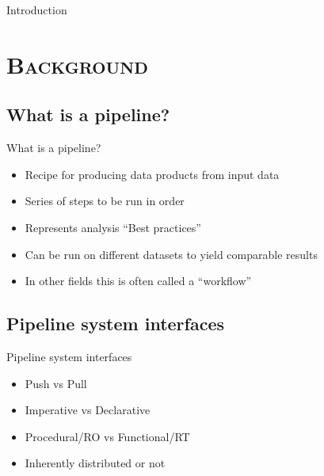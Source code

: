 \documentclass[xcolor=x11names,compress]{beamer}
\renewcommand{\(}{\begin{columns}}
\renewcommand{\)}{\end{columns}}
\newcommand{\<}[1]{\begin{column}{#1}}
\renewcommand{\>}{\end{column}}
\begin{document}
\begin{frame}{Introduction}
\pipesbackground
\begin{shadedbox}
\tableofcontents
\end{shadedbox}
\end{frame}


\section{\scshape Background}

\subsection{What is a pipeline?}
\begin{frame}{What is a pipeline?}
\pipesbackground
\begin{shadedbox}
\begin{itemize}
\item Recipe for producing data products from input data
\item Series of steps to be run in order
\item Represents analysis ``Best practices''
\item Can be run on different datasets to yield comparable results
\item In other fields this is often called a ``workflow''
\end{itemize}
\end{shadedbox}
\end{frame}

\subsection{Pipeline system interfaces}
\begin{frame}{Pipeline system interfaces}
\pipesbackground
\begin{shadedbox}
\begin{itemize}
\item Push vs Pull
\item Imperative vs Declarative
\item Procedural/RO vs Functional/RT
\item Inherently distributed or not 
\end{itemize}
\end{shadedbox}
\end{frame}
\end{document}
